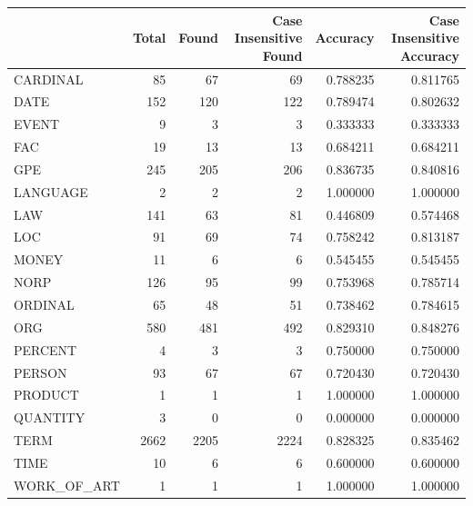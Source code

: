 \begin{tabular}{lrrrrr}
\toprule
 & Total & Found & Case Insensitive Found & Accuracy & Case Insensitive Accuracy \\
\midrule
CARDINAL & 85 & 67 & 69 & 0.788235 & 0.811765 \\
DATE & 152 & 120 & 122 & 0.789474 & 0.802632 \\
EVENT & 9 & 3 & 3 & 0.333333 & 0.333333 \\
FAC & 19 & 13 & 13 & 0.684211 & 0.684211 \\
GPE & 245 & 205 & 206 & 0.836735 & 0.840816 \\
LANGUAGE & 2 & 2 & 2 & 1.000000 & 1.000000 \\
LAW & 141 & 63 & 81 & 0.446809 & 0.574468 \\
LOC & 91 & 69 & 74 & 0.758242 & 0.813187 \\
MONEY & 11 & 6 & 6 & 0.545455 & 0.545455 \\
NORP & 126 & 95 & 99 & 0.753968 & 0.785714 \\
ORDINAL & 65 & 48 & 51 & 0.738462 & 0.784615 \\
ORG & 580 & 481 & 492 & 0.829310 & 0.848276 \\
PERCENT & 4 & 3 & 3 & 0.750000 & 0.750000 \\
PERSON & 93 & 67 & 67 & 0.720430 & 0.720430 \\
PRODUCT & 1 & 1 & 1 & 1.000000 & 1.000000 \\
QUANTITY & 3 & 0 & 0 & 0.000000 & 0.000000 \\
TERM & 2662 & 2205 & 2224 & 0.828325 & 0.835462 \\
TIME & 10 & 6 & 6 & 0.600000 & 0.600000 \\
WORK_OF_ART & 1 & 1 & 1 & 1.000000 & 1.000000 \\
\bottomrule
\end{tabular}
